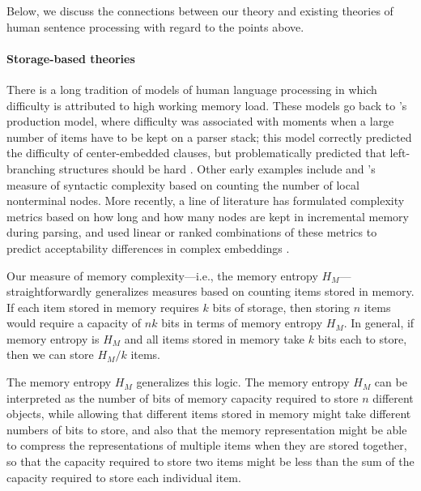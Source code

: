 Below, we discuss the connections between our theory and existing theories of human sentence processing with regard to the points above.

\paragraph{Storage-based theories}

There is a long tradition of models of human language processing in which difficulty is attributed to high working memory load. 
These models go back to \citet{yngve1960model}'s production model, where difficulty was associated with moments when a large number of items have to be kept on a parser stack; this model correctly predicted the difficulty of center-embedded clauses, but problematically predicted that left-branching structures should be hard \citep{kimball1973}. Other early examples include \citet{miller-finitary-1963} and \citet{frazier1985syntactic}'s measure of syntactic complexity based on counting the number of local nonterminal nodes. More recently, a line of literature has formulated complexity metrics based on how long and how many nodes are kept in incremental memory during parsing, and used linear or ranked combinations of these metrics to predict acceptability differences in complex embeddings \citep{kobele2013memory,graf2014evaluating,rambow201512,GrafEtAl15MOL,gerth2015memory,GrafEtAl17JLM,desanto2020parsing}.


Our measure of memory complexity---i.e., the memory entropy $H_M$---straightforwardly generalizes measures based on counting items stored in memory. If each item stored in memory requires $k$ bits of storage, then storing $n$ items would require a capacity of $nk$ bits in terms of memory entropy $H_M$. In general, if memory entropy is $H_M$ and all items stored in memory take $k$ bits each to store, then we can store $H_M/k$ items. 

The memory entropy $H_M$ generalizes this logic. The memory entropy $H_M$ can be interpreted as the number of bits of memory capacity required to store $n$ different objects, while allowing that different items stored in memory might take different numbers of bits to store, and also that the memory representation might be able to compress the representations of multiple items when they are stored together, so that the capacity required to store two items might be less than the sum of the capacity required to store each individual item. 

